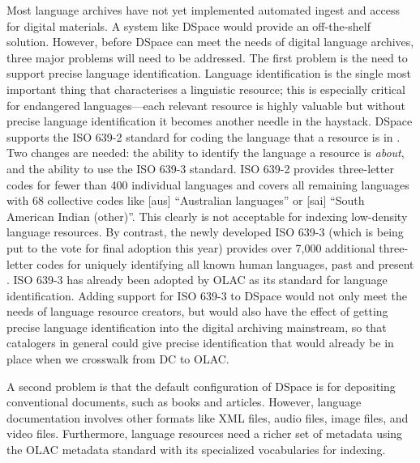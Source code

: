 Most language archives have not yet implemented automated ingest and
access for digital materials.  A system like DSpace would provide 
an off-the-shelf solution.  
However, before DSpace can meet the needs of digital language archives,
three major problems will need to be addressed.
The first problem is the need to support precise language identification.
Language identification is the single most important thing that
characterises a linguistic resource; this is especially critical for
endangered languages---each relevant resource is highly valuable but
without precise language identification it becomes another needle in
the haystack. DSpace supports the ISO 639-2 standard for coding the
language that a resource is in \citep{ISO639-2}. Two changes are needed:
the ability to identify the language a resource is \emph{about}, and
the ability to use the ISO 639-3 standard.  ISO 639-2 provides
three-letter codes for fewer than 400 individual languages and covers all
remaining languages with 68 collective codes like [aus] ``Australian 
languages'' or [sai] ``South American Indian (other)''.  This clearly
is not acceptable for indexing low-density language resources.
By contrast, the newly developed ISO 639-3 (which is being put to
the vote for final adoption this year) provides over 7,000 additional
three-letter codes for uniquely identifying all known human languages,
past and present \citep{ISO639-3}.  ISO 639-3 has already been adopted by OLAC as its
standard for language identification.
Adding support for ISO 639-3 to DSpace would not only meet the
needs of language resource creators, but would also have the
effect of getting precise language identification into the 
digital archiving mainstream, so that catalogers in general could
give precise identification that would already be in place
when we crosswalk from DC to OLAC.


A second problem is that the default configuration of DSpace
is for depositing conventional documents, such as books and articles.
However, language documentation involves other formats like
XML files, audio files, image files, and video files. Furthermore,
language resources need a richer set of metadata using the OLAC 
metadata standard with its specialized vocabularies for indexing.


